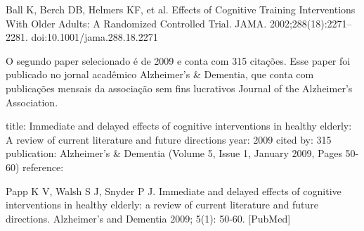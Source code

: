 \documentclass[a4paper]{article}    %
\begin{document}
Ball K, Berch DB, Helmers KF, et al. Effects of Cognitive Training Interventions With Older Adults: A Randomized Controlled Trial. JAMA. 2002;288(18):2271–2281. doi:10.1001/jama.288.18.2271


O segundo paper selecionado é de 2009 e conta com 315 citações. Esse paper foi publicado no jornal acadêmico Alzheimer's \& Dementia, que conta com publicações mensais da associação sem fins lucrativos Journal of the Alzheimer's Association.

title: Immediate and delayed effects of cognitive interventions in healthy elderly: A review of current literature and future directions
year: 2009
cited by: 315
publication: Alzheimer's \& Dementia (Volume 5, Issue 1, January 2009, Pages 50-60)
reference:

Papp K V, Walsh S J, Snyder P J. Immediate and delayed effects of cognitive interventions in healthy elderly: a review of current literature and future directions. Alzheimer's and Dementia 2009; 5(1): 50-60. [PubMed]

\end{document}
